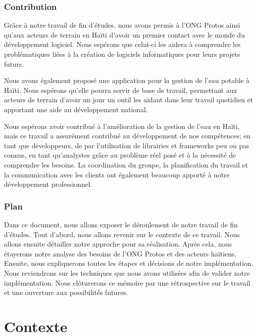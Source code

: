 \documentclass{EPL-master-thesis-covers-FR}
\begin{document}
		\subsection*{Contribution}

			Grâce à notre travail de fin d'études, nous avons permis à l'ONG Protos ainsi qu'aux acteurs de terrain en Haïti d'avoir un premier contact avec le monde du développement logiciel. Nous espérons que celui-ci les aidera à comprendre les problématiques liées à la création de logiciels informatiques pour leurs projets futurs.

			Nous avons également proposé une application pour la gestion de l'eau potable à Haïti. Nous espérons qu'elle pourra servir de base de travail, permettant aux acteurs de terrain d'avoir un jour un outil les aidant dans leur travail quotidien et apportant une aide au développement national.

			Nous espérons avoir contribué à l'amélioration de la gestion de l'eau en Haïti, mais ce travail a assurément contribué au développement de nos compétences; en tant que développeurs, de par l'utilisation de librairies et frameworks peu ou pas connus, en tant qu'analystes grâce au problème réel posé et à la nécessité de comprendre les besoins. La coordination du groupe, la planification du travail et la communication avec les clients ont également beaucoup apporté à notre développement professionnel.

		\subsection*{Plan}

			Dans ce document, nous allons exposer le déroulement de notre travail de fin d'études. Tout d'abord, nous allons revenir sur le contexte de ce travail. Nous allons ensuite détailler notre approche pour sa réalisation. Après cela, nous étayerons notre analyse des besoins de l'ONG Protos et des acteurs haïtiens. Ensuite, nous expliquerons toutes les étapes et décisions de notre implémentation. Nous reviendrons sur les techniques que nous avons utilisées afin de valider notre implémentation. Nous clôturerons ce mémoire par une rétrospective sur le travail et une ouverture aux possibilités futures.

	\chapter{Contexte}

\end{document}
